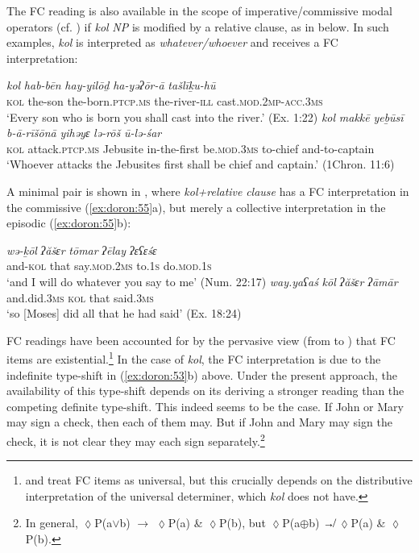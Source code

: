 \documentclass[output=paper]{langsci/langscibook}
\begin{document}
The FC reading is also available in the scope of imperative/commissive modal operators (cf. \citealt{Dayal2013}) if \textit{kol} \textit{NP} is modified by a relative clause, as in  below. In such examples, \textit{kol} is interpreted as \textit{whatever/whoever} and receives a FC interpretation:

\ea%
    \label{ex:doron:54}
    \ea
    \gll \textit{kol}   \textit{hab-bēn} \textit{hay-yilōḏ}                 \textit{ha-yəʔōr-ā}     \textit{tašlīḵu-hū}\\
         \textsc{kol} the-son  the-born.\textsc{ptcp.ms}  the-river-\textsc{ill}  cast.\textsc{mod.2mp-acc.3ms} \\
    \glt `Every son who is born you shall cast into the river.' (Ex. 1:22)
    \ex
    \gll \textit{kol}   \textit{makkē}                 \textit{yeḇūsī}    \textit{b-ā-rīšōnā}     \textit{yihǝyɛ}            \textit{lə-rōš}     \textit{ū-lə-śar}\\
         \textsc{kol} attack.\textsc{ptcp.ms}  Jebusite  in-the-first  be.\textsc{mod.3ms} to-chief  and-to-captain\\
    \glt `Whoever attacks the Jebusites first shall be\textsuperscript{} chief and captain.' (1Chron. 11:6)
    \z
\z

A minimal pair is shown in , where \textit{kol+relative} \textit{clause} has a FC interpretation in the commissive (\ref{ex:doron:55}a), but merely a collective interpretation in the episodic (\ref{ex:doron:55}b):

\ea%
    \label{ex:doron:55}
    \ea
    \gll \textit{wə-ḵōl}     \textit{ʔăšɛr}  \textit{tōmar}               \textit{ʔēlay}     \textit{ʔɛʕɛśɛ}\\
         and-\textsc{kol}  that    say.\textsc{mod}.\textsc{2ms}   to.\textsc{1s}     do.\textsc{mod.1s}\\
    \glt `and I will do whatever you say to me' (Num. 22:17)
    \ex
    \gll \textit{way.yaʕaś}      \textit{kōl}   \textit{ʔăšɛr}  \textit{ʔāmār} \\
         and.did.\textsc{3ms}   \textsc{kol} that     said.\textsc{3ms}\\
    \glt `so [Moses] did all that he had said' (Ex. 18:24)
    \z
\z

FC readings have been accounted for by the pervasive view (from \citealt{KadmonLandman1993} to \citealt{Chierchia2013}) that FC items are existential.\footnote{\citet{Benito2010} and \citet{Zimmermann2008} treat FC items as universal, but this crucially depends on the distributive interpretation of the universal determiner, which \textit{kol} does not have.} In the case of \textit{kol}, the FC interpretation is due to the indefinite type-shift in (\ref{ex:doron:53}b) above. Under the present approach, the availability of this type-shift depends on its deriving a stronger reading than the competing definite type-shift. This indeed seems to be the case. If John or Mary may sign a check, then each of them may. But if John and Mary may sign the check, it is not clear they may each sign separately.\footnote{ \textrm{In general, ${\lozenge}$P(a${\vee}$b) ${\rightarrow}$  ${\lozenge}$P(a) \& ${\lozenge}$P(b), but  ${\lozenge}$P(a${\oplus}$}b) ↛ ${\lozenge}$P(a) \& ${\lozenge}$P(b).}
\end{document}
